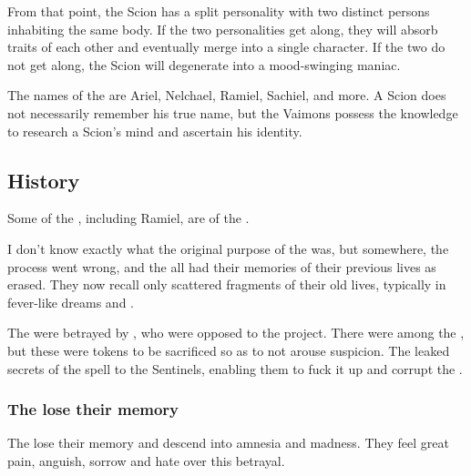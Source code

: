 From that point, the Scion has a split personality with two distinct persons inhabiting the same body. If the two personalities get along, they will absorb traits of each other and eventually merge into a single character. If the two do not get along, the Scion will degenerate into a mood-swinging maniac.


The names of the \Malachim{} are Ariel, Nelchael, Ramiel, Sachiel, \Belzirmalach{} and more. A Scion does not necessarily remember his true name, but the Vaimons possess the knowledge to research a Scion's mind and ascertain his \Malach{} identity. 







\subsection{History}
Some of the \Malachim, including Ramiel, are of the \bloodresphain. 


I don't know exactly what the original purpose of the \Malachim{} was, but somewhere, the process went wrong, and the \Malachim{} all had their memories of their previous lives as \resphain{} erased. They now recall only scattered fragments of their old lives, typically in fever-like dreams and \deajvus. 


The \Malachim{} were betrayed by \TimnathSerah, who were opposed to the project. There were \Timnaths{} among the \Malachim, but these were tokens to be sacrificed so as to not arouse suspicion. The \TimnathSerah{} leaked secrets of the spell to the Sentinels, enabling them to fuck it up and corrupt the \Malachim. 





\subsubsection{The \Malachim{} lose their memory}
The \malachim{} lose their memory and descend into amnesia and madness. 
They feel great pain, anguish, sorrow and hate over this betrayal.

